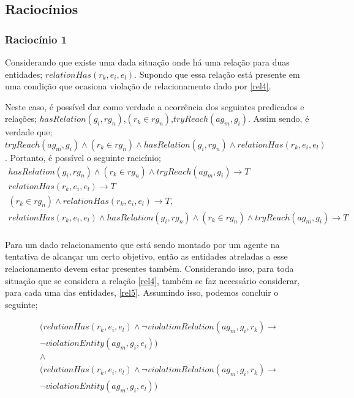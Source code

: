 \documentclass[12pt]{article}
\begin{document}
\subsection{Raciocínios}

\subsubsection{Raciocínio 1}

Considerando que existe uma dada situação onde há uma relação para duas entidades; $relationHas(r_k,e_i,e_l)$. Supondo que essa relação está presente em uma condição que ocasiona violação de relacionamento dado por \ref{rel4}.

Neste caso, é possível dar como verdade a ocorrência dos seguintes predicados e relações; $hasRelation(g_i,rg_n)$,$(r_k \in rg_n)$,$tryReach(ag_m,g_i)$. Assim sendo, é verdade que; $tryReach(ag_m,g_i) \wedge (r_k \in rg_n) \wedge hasRelation(g_i,rg_n) \wedge relationHas(r_k,e_i,e_l)$. Portanto, é possível o seguinte racicínio;
\begin{eqnarray}\label{rac1}
	hasRelation(g_i,rg_n) \wedge (r_k \in rg_n) \wedge  tryReach(ag_m,g_i) \to T \nonumber \\
	relationHas(r_k,e_i,e_l) \to T \nonumber \\
	(r_k \in rg_n) \wedge relationHas(r_k,e_i,e_l) \to T, \nonumber \\
	relationHas(r_k,e_i,e_l) \wedge hasRelation(g_i,rg_n) \wedge (r_k \in rg_n) \wedge  tryReach(ag_m,g_i) \to T \nonumber \\
\end{eqnarray}

Para um dado relacionamento que está sendo montado por um agente na tentativa de alcançar um certo objetivo, então as entidades atreladas a esse relacionamento devem estar presentes também. Considerando isso, para toda situação que se considera a relação \ref{rel4}, também se faz necessário considerar, para cada uma das entidades, \ref{rel5}. Assumindo isso, podemos concluir o seguinte; 

\begin{eqnarray}\label{rac1b}
	(relationHas(r_k,e_i,e_l) \wedge \neg violationRelation(ag_m,g_i,r_k) \to \nonumber \\
	\neg violationEntity(ag_m,g_i,e_i)) \nonumber \\  
	\wedge \nonumber \\
	(relationHas(r_k,e_i,e_l) \wedge \neg violationRelation(ag_m,g_i,r_k) \to \nonumber \\
	\neg violationEntity(ag_m,g_i,e_l)) \nonumber \\  
\end{eqnarray}
\end{document}

